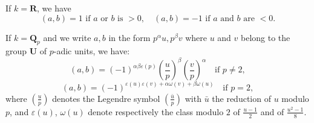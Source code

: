 If $k = \mathbf{R}$, we have
$$
(a, b) = 1 \text{ if } a \text{ or } b \text{ is } > 0, \quad (a, b) = -1 \text{ if } a \text{ and } b \text{ are } < 0.
$$

If $k = \mathbf{Q}_p$ and we write $a, b$ in the form $p^\alpha u, p^\beta v$ where $u$ and $v$ belong to the group $\mathbf{U}$ of $p$-adic units, we have:
$$
(a, b) = (-1)^{\alpha \beta \varepsilon(p)} \left( \frac{u}{p} \right)^\beta \left( \frac{v}{p} \right)^\alpha \quad \text{if } p \neq 2,
$$
$$
(a, b) = (-1)^{\varepsilon(u) \varepsilon(v) + \alpha \omega(v) + \beta \omega(u)} \quad \text{if } p = 2,
$$
where $\left( \frac{u}{p} \right)$ denotes the Legendre symbol $\left( \frac{\bar{u}}{p} \right)$ with $\bar{u}$ the reduction of $u$ modulo $p$, and $\varepsilon(u)$, $\omega(u)$ denote respectively the class modulo $2$ of $\frac{u-1}{2}$ and of $\frac{u^2-1}{8}$.
